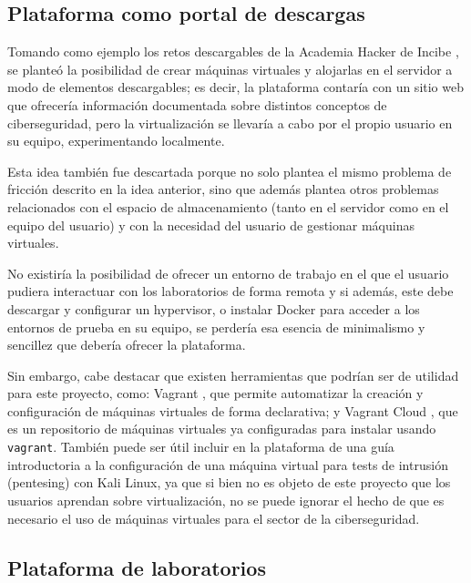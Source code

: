         
        \subsection{Plataforma como portal de descargas}

            Tomando como ejemplo los retos descargables de la Academia Hacker de Incibe \cite{retos-INCIBE}, se planteó la posibilidad de crear máquinas virtuales y alojarlas en el servidor a modo de elementos descargables; es decir, la plataforma contaría con un sitio web que ofrecería información documentada sobre distintos conceptos de ciberseguridad, pero la virtualización se llevaría a cabo por el propio usuario en su equipo, experimentando localmente.

            Esta idea también fue descartada porque no solo plantea el mismo problema de fricción descrito en la idea anterior, sino que además plantea otros problemas relacionados con el espacio de almacenamiento (tanto en el servidor como en el equipo del usuario) y con la necesidad del usuario de gestionar máquinas virtuales.
            
            No existiría la posibilidad de ofrecer un entorno de trabajo en el que el usuario pudiera interactuar con los laboratorios de forma remota y si además, este debe descargar y configurar un hypervisor, o instalar Docker para acceder a los entornos de prueba en su equipo, se perdería esa esencia de minimalismo y sencillez que debería ofrecer la plataforma.

            Sin embargo, cabe destacar que existen herramientas que podrían ser de utilidad para este proyecto, como: Vagrant \cite{vagrant}, que permite automatizar la creación y configuración de máquinas virtuales de forma declarativa; y Vagrant Cloud \cite{vagrant-cloud}, que es un repositorio de máquinas virtuales ya configuradas para instalar usando \texttt{vagrant}. También puede ser útil incluir en la plataforma de una guía introductoria a la configuración de una máquina virtual para tests de intrusión (pentesing) con Kali Linux, ya que si bien no es objeto de este proyecto que los usuarios aprendan sobre virtualización, no se puede ignorar el hecho de que es necesario el uso de máquinas virtuales para el sector de la ciberseguridad.

        
        \subsection{Plataforma de laboratorios}

